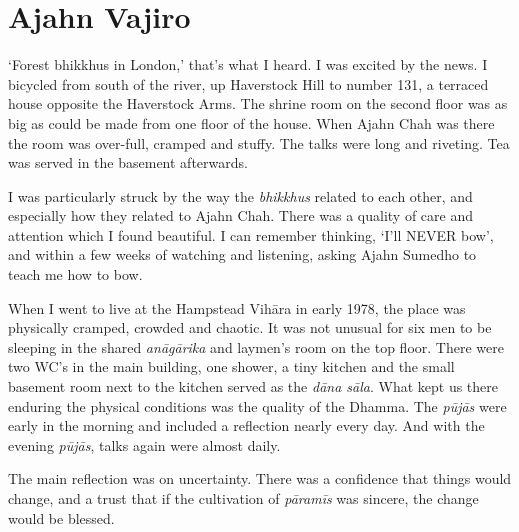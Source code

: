 \section{Ajahn Vajiro}

`Forest bhikkhus in London,' that's what I heard. I was excited by the
news. I bicycled from south of the river, up Haverstock Hill to number
131, a terraced house opposite the Haverstock Arms. The shrine room on
the second floor was as big as could be made from one floor of the
house. When Ajahn Chah was there the room was over-full, cramped and
stuffy. The talks were long and riveting. Tea was served in the basement
afterwards. 

I was particularly struck by the way the \emph{bhikkhus} related to each
other, and especially how they related to Ajahn Chah. There was a
quality of care and attention which I found beautiful. I can remember
thinking, `I'll NEVER bow', and within a few weeks of watching and
listening, asking Ajahn Sumedho to teach me how to bow. 

When I went to live at the Hampstead Vihāra in early 1978, the place was
physically cramped, crowded and chaotic. It was not unusual for six men
to be sleeping in the shared \emph{anāgārika} and laymen's room on the top
floor. There were two WC's in the main building, one shower, a tiny
kitchen and the small basement room next to the kitchen served as the
\emph{dāna sāla}. What kept us there enduring the physical conditions
was the quality of the Dhamma. The \emph{pūjās} were early in the
morning and included a reflection nearly every day. And with the evening
\emph{pūjās}, talks again were almost daily. 

The main reflection was on uncertainty. There was a confidence that
things would change, and a trust that if the cultivation of
\emph{pāramīs} was sincere, the change would be blessed. 

